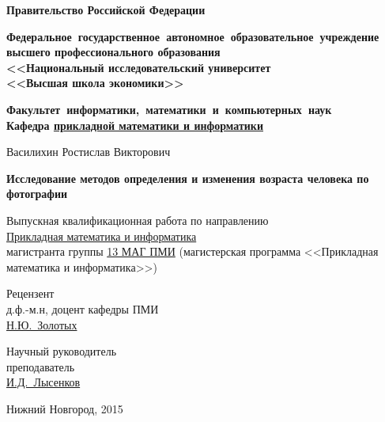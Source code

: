 \documentclass[a4paper,14pt]{extarticle}
\begin{document}
\begin{titlepage}
\begin{center}
  \textbf{\small
    Правительство Российской Федерации
  }
  \vspace{1.0em}
  
  \textbf{\small
    \mbox{Федеральное государственное автономное образовательное учреждение}\\
	высшего профессионального образования\\
    <<Национальный исследовательский университет \\
    <<Высшая школа экономики>>}
   \vspace{1.0em} 
    
    \textbf{\small
    \mbox{Факультет информатики, математики и компьютерных наук}\\
    Кафедра \underline{прикладной математики и информатики}
  }
\end{center}

\vspace{1.0em}

\begin{center}
  Василихин Ростислав Викторович
\end{center}

\begin{center}
  \textbf{Исследование методов определения и изменения возраста человека по фотографии}
\end{center}

\begin{center}
  Выпускная квалификационная работа по направлению\\
  \underline{Прикладная математика и информатика}\\
  магистранта группы %
  \underline{13 МАГ ПМИ}
   (магистерская программа <<Прикладная математика и информатика>>)
\end{center}

\vspace{2.0em}

\begin{minipage}{0.5\textwidth}
  \begin{flushleft}
    Рецензент\\
    д.ф.-м.н, доцент кафедры ПМИ\\
    \underline{Н.Ю.~Золотых}
  \end{flushleft}
\end{minipage}
\begin{minipage}{0.5\textwidth}
  \begin{flushright}
    Научный руководитель\\
    преподаватель\\
    \underline{И.Д.~Лысенков}
  \end{flushright}
\end{minipage}

\vspace{\fill}
\begin{center}
Нижний Новгород, 2015
\end{center}

\end{titlepage}
\end{document}

